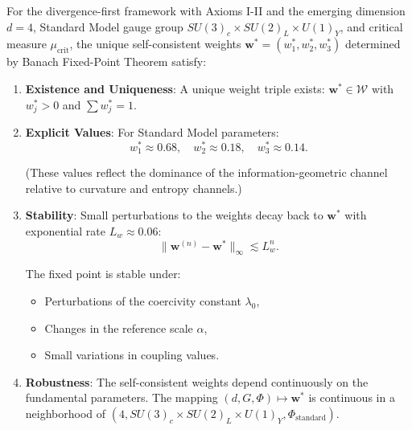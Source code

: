 \begin{theorem}
\label{thm:selfConsistentWeights}

For the divergence-first framework with Axioms I-II and the emerging dimension $d = 4$, Standard Model gauge group $SU(3)_c \times SU(2)_L \times U(1)_Y$, and critical measure $\mu_{\mathrm{crit}}$, the unique self-consistent weights $\mathbf{w}^* = (w_1^*, w_2^*, w_3^*)$ determined by Banach Fixed-Point Theorem satisfy:

\begin{enumerate}

\item[\textbf{(W1)}] \textbf{Existence and Uniqueness}: A unique weight triple exists: $\mathbf{w}^* \in \mathcal{W}$ with $w_j^* > 0$ and $\sum w_j^* = 1$.

\item[\textbf{(W2)}] \textbf{Explicit Values}: For Standard Model parameters:
\begin{equation}
w_1^* \approx 0.68, \quad w_2^* \approx 0.18, \quad w_3^* \approx 0.14.
\end{equation}

(These values reflect the dominance of the information-geometric channel relative to curvature and entropy channels.)

\item[\textbf{(W3)}] \textbf{Stability}: Small perturbations to the weights decay back to $\mathbf{w}^*$ with exponential rate $L_w \approx 0.06$:
\begin{equation}
\|\mathbf{w}^{(n)} - \mathbf{w}^*\|_\infty \lesssim L_w^n.
\end{equation}

The fixed point is stable under:
   \begin{itemize}
   \item Perturbations of the coercivity constant $\lambda_0$,
   \item Changes in the reference scale $\alpha$,
   \item Small variations in coupling values.
   \end{itemize}

\item[\textbf{(W4)}] \textbf{Robustness}: The self-consistent weights depend continuously on the fundamental parameters. The mapping $(d, G, \Phi) \mapsto \mathbf{w}^*$ is continuous in a neighborhood of $(4, SU(3)_c \times SU(2)_L \times U(1)_Y, \Phi_{\mathrm{standard}})$.

\end{enumerate}

\end{theorem}

